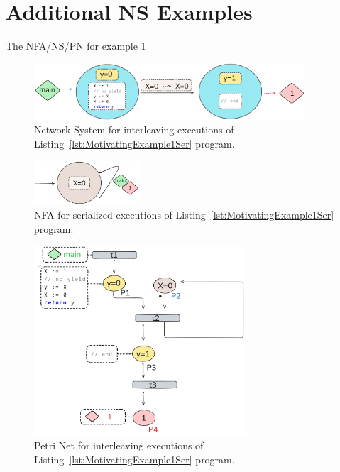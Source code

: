 
\section{Additional NS Examples}
\label{sec:appendixBMoreExample}


The NFA/NS/PN for example 1



\begin{figure}[htbp]
	\centering
	\includegraphics[width=0.9\textwidth]{plots/code_1_NS.png}
	\caption{Network System for interleaving executions of Listing~\ref{lst:MotivatingExample1Ser} program.}
	\label{fig:code1ExampleNS}
\end{figure}


\begin{figure}[htbp]
	\centering
	\includegraphics[width=0.35\textwidth]{plots/code_1_NFA.png}
	\caption{NFA for serialized executions of Listing~\ref{lst:MotivatingExample1Ser} program.}
	\label{fig:code1ExampleNFA}
\end{figure}



\begin{figure}[htbp]
	\centering
	\includegraphics[width=0.7\textwidth]{plots/code_1_PN_with_annotation.png}
	\caption{Petri Net for interleaving executions of Listing~\ref{lst:MotivatingExample1Ser} program.}
	\label{fig:code1ExamplePN}
\end{figure}

%